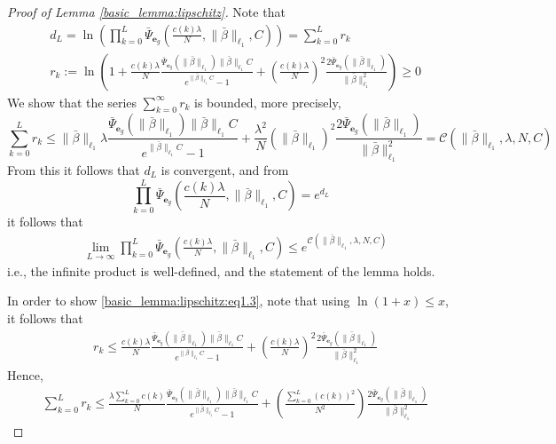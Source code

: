 \documentclass{article}
\def\rve{{\mathbf{e}}}
\begin{document}
\begin{proof}[Proof of Lemma \ref{basic_lemma:lipschitz}]
        Note that 
        \[
        \begin{aligned}
        &  d_L=\ln\left(\prod_{k=0}^{L} \bar{\Psi}_{\rve_g}\left(\frac{c(k) \lambda}{N},\|\bar{\beta}\|_{\ell_1},C\right) \right)=\sum_{k=0}^{L} r_k \\
        & r_k:=\ln \left(1+\frac{c(k) \lambda}{N} \frac{\bar{\Psi}_{\rve_g}(\|\bar{\beta}\|_{\ell_1})\|\bar{\beta}\|_{\ell_1}C}{e^{\|\bar{\beta}\|_{\ell_1}C}-1} + \left(\frac{c(k) \lambda}{N}\right)^2 \frac{2\bar{\Psi}_{\rve_g}(\|\bar{\beta}\|_{\ell_1})}{\|\bar{\beta}\|_{\ell_1}^2} \right) \geq 0
        \end{aligned}
        \]
        We show that the series $\sum_{k=0}^{\infty} r_k$ 
        is bounded, more precisely, 
        \[
        \sum_{k=0}^{L} r_k \le 
      \|\bar{\beta}\|_{\ell_1} \lambda \frac{\bar{\Psi}_{\rve_g}(\|\bar{\beta}\|_{\ell_1})\|\bar{\beta}\|_{\ell_1}C}{e^{\|\bar{\beta}\|_{\ell_1}C}-1} + \frac{\lambda^2}{N} (\|\bar{\beta}\|_{\ell_1})^2 \frac{2\bar{\Psi}_{\rve_g}(\|\bar{\beta}\|_{\ell_1})}{\|\bar{\beta}\|_{\ell_1}^2} = \mathcal{C} (\|\bar{\beta}\|_{\ell_1},\lambda,N,C)
        \]
        From this it follows that $d_L$ is convergent, and from
        \[
      \prod_{k=0}^{ L} \bar{\Psi}_{\rve_g}\left(\frac{c(k) \lambda}{N},\|\bar{\beta}\|_{\ell_1},C\right) = e^{d_L}
        \]
        it follows that  
        \begin{equation}
       \label{basic_lemma:lipschitz:eq1.3}
       \begin{aligned}
        & \lim_{L \rightarrow \infty} 
        \prod_{k=0}^{ L} \bar{\Psi}_{\rve_g}\left(\frac{c(k) \lambda}{N},\|\bar{\beta}\|_{\ell_1},C\right) \le  e^{\mathcal{C}(\|\bar{\beta}\|_{\ell_1},\lambda,N,C)}
       \end{aligned}
        \end{equation}
        i.e., the infinite product is well-defined, and the statement of the lemma holds. 

        In order to show \eqref{basic_lemma:lipschitz:eq1.3}, note that using $\ln(1+x) \le x$, it follows that 
        \[
        \begin{aligned}
      & r_k \le \frac{c(k) \lambda}{N} \frac{\bar{\Psi}_{\rve_g}(\|\bar{\beta}\|_{\ell_1})\|\bar{\beta}\|_{\ell_1}C}{e^{\|\bar{\beta}\|_{\ell_1}C}-1} + \left(\frac{c(k) \lambda}{N}\right)^2 \frac{2\bar{\Psi}_{\rve_g}(\|\bar{\beta}\|_{\ell_1})}{\|\bar{\beta}\|_{\ell_1}^2}
        \end{aligned}
        \]
        Hence,
        \[
        \begin{aligned}
      & \sum_{k=0}^{L} r_k  \le \frac{\lambda \sum_{k=0}^{L}c(k)}{N} \frac{\bar{\Psi}_{\rve_g}(\|\bar{\beta}\|_{\ell_1})\|\bar{\beta}\|_{\ell_1}C}{e^{\|\bar{\beta}\|_{\ell_1}C}-1} +  \left(\frac{\sum_{k=0}^{L} (c(k))^2}{N^2}\right) \frac{2\bar{\Psi}_{\rve_g}(\|\bar{\beta}\|_{\ell_1})}{\|\bar{\beta}\|_{\ell_1}^2}
        \end{aligned}
        \]
        

\end{proof}
\end{document}
